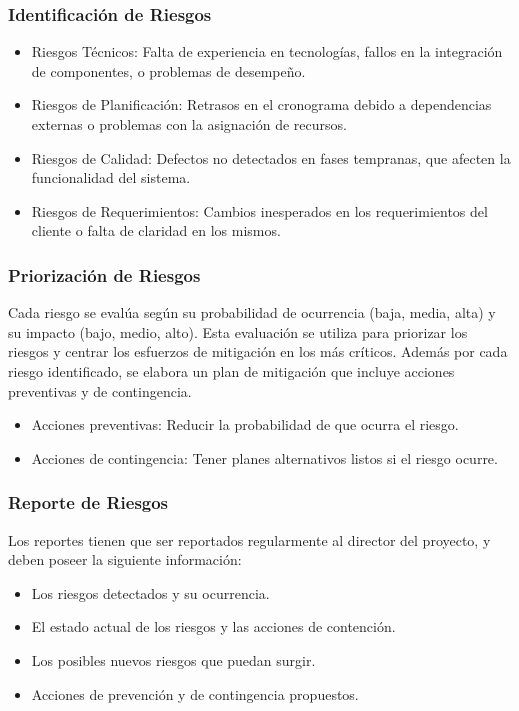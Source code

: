 \documentclass[a4paper,10pt]{article}
\begin{document}
	\subsubsection{Identificación de Riesgos}
	\begin{itemize}
		\item Riesgos Técnicos: Falta de experiencia en tecnologías, fallos en la integración de componentes, o problemas de desempeño.
		\item Riesgos de Planificación: Retrasos en el cronograma debido a dependencias externas o problemas con la asignación de recursos.
		\item Riesgos de Calidad: Defectos no detectados en fases tempranas, que afecten la funcionalidad del sistema.
		\item Riesgos de Requerimientos: Cambios inesperados en los requerimientos del cliente o falta de claridad en los mismos.
	\end{itemize}
	
	\subsubsection{Priorización de Riesgos}
	Cada riesgo se evalúa según su probabilidad de ocurrencia (baja, media, alta) y su impacto (bajo, medio, alto). Esta evaluación se utiliza para priorizar los riesgos y centrar los esfuerzos de mitigación en los más críticos. Además por cada riesgo identificado, se elabora un plan de mitigación que incluye acciones preventivas y de contingencia.
	
	\begin{itemize}
		\item Acciones preventivas: Reducir la probabilidad de que ocurra el riesgo.
		\item Acciones de contingencia: Tener planes alternativos listos si el riesgo ocurre.
	\end{itemize}
	
	\subsubsection{Reporte de Riesgos}
	Los reportes tienen que ser reportados regularmente al director del proyecto, y deben poseer la siguiente información:
	\begin{itemize}
		\item Los riesgos detectados y su ocurrencia.
		\item El estado actual de los riesgos y las acciones de contención.
		\item Los posibles nuevos riesgos que puedan surgir.
		\item Acciones de prevención y de contingencia propuestos.
	\end{itemize}
	
\end{document}
